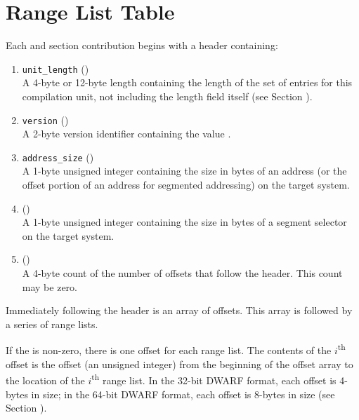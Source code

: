 \section{Range List Table}
\label{app:ranglisttable}
Each \dotdebugrnglists{} and \dotdebugrnglistsdwo{} section 
\bb
contribution
\eb
begins with a header containing:
\begin{enumerate}[1. ]
\item \texttt{unit\_length} () \\
A 4-byte or 12-byte length containing the length of
the set of entries for this compilation unit, not
including the length field itself
\bb
(see Section ).
\eb

\item  \texttt{version} (\HFTuhalf) \\
A 2-byte version identifier containing the value
\versiondotdebugrnglists{}. 

\item	\texttt{address\_size} (\HFTubyte) \\
A 1-byte unsigned integer containing the size in
bytes of an address (or the offset portion of an
address for segmented addressing) on the target
system.

\item	\HFNsegmentselectorsize{} (\HFTubyte) \\
A 1-byte unsigned integer containing the size in
bytes of a segment selector on the target system.

\item   \HFNoffsetentrycount{} (\HFTuword) \\
A 4-byte count of the number of offsets
that follow the header. This count may be zero.
\end{enumerate}

Immediately following the header is an array of offsets.
This array is followed by a series of range lists. 

If the \HFNoffsetentrycount{} is non-zero, there 
is one offset for each range list. The contents
of the $i$\textsuperscript{th} offset is the offset 
(an unsigned integer) from the
beginning of the offset array to the location of the 
$i$\textsuperscript{th} range list.
In the 32-bit DWARF format, each offset is 4-bytes in size; 
in the 64-bit DWARF format, each offset is 8-bytes in size 
(see Section ).

